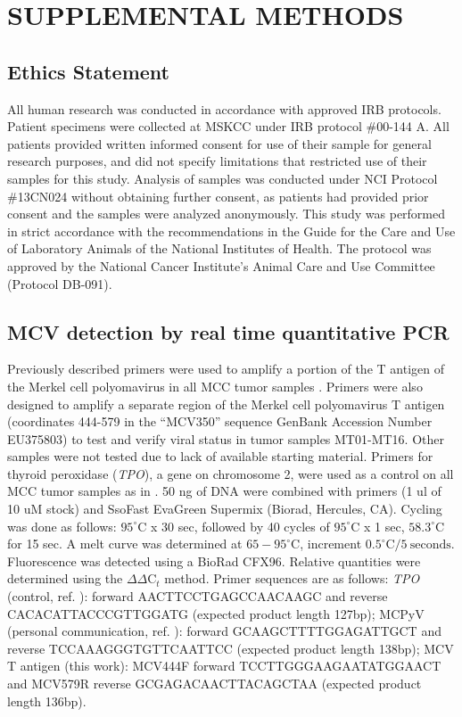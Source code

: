 \documentclass[10pt]{article}
\date{}
\begin{document}

\section*{SUPPLEMENTAL METHODS}

\subsection*{Ethics Statement}

All human research was conducted in accordance with approved IRB protocols.
Patient specimens were collected at MSKCC under IRB protocol \#00-144 A.
All patients provided written informed consent for use of their sample for general research purposes, and did not specify limitations that restricted use of their samples for this study.
Analysis of samples was conducted under NCI Protocol \#13CN024 without obtaining further consent, as patients had provided prior consent and the samples were analyzed anonymously.
This study was performed in strict accordance with the recommendations in the Guide for the Care and Use of Laboratory Animals of the National Institutes of Health.
The protocol was approved by the National Cancer Institute's Animal Care and Use Committee (Protocol DB-091).

\subsection*{MCV detection by real time quantitative PCR}
Previously described primers were used to amplify a portion of the T antigen of the Merkel cell polyomavirus in all MCC tumor samples \cite[personal~communication]{Garneski2008Merkel}.
Primers were also designed to amplify a separate region of the Merkel cell polyomavirus T antigen (coordinates 444-579 in the ``MCV350'' sequence GenBank Accession Number EU375803) to test and verify viral status in tumor samples MT01-MT16.
Other samples were not tested due to lack of available starting material.
Primers for thyroid peroxidase (\emph{TPO}), a gene on chromosome 2, were used as a control on all MCC tumor samples as in \citep{Paulson2008ArrayCGH}.
50 ng of DNA were combined with primers (1 ul of 10 uM stock) and SsoFast EvaGreen Supermix (Biorad, Hercules, CA).
Cycling was done as follows: $95^{\circ}\mathrm{C}$ x 30 sec, followed by 40 cycles of $95^{\circ}\mathrm{C}$ x 1 sec, $58.3^{\circ}\mathrm{C}$ for 15 sec.
A melt curve was determined at $65-95^{\circ}\mathrm{C}$, increment $0.5^{\circ}\mathrm{C}/5\mathrm{~seconds}$.
Fluorescence was detected using a BioRad CFX96.
Relative quantities were determined using the $\Delta\Delta\mathrm{C}_t$ method.
Primer sequences are as follows: \emph{TPO} (control, ref. \citep{Paulson2008ArrayCGH}): forward AACTTCCTGAGCCAACAAGC and reverse CACACATTACCCGTTGGATG (expected product length 127bp);
MCPyV (personal communication, ref. \citep{Garneski2008Merkel}): forward GCAAGCTTTTGGAGATTGCT and reverse TCCAAAGGGTGTTCAATTCC (expected product length 138bp);
MCV T antigen (this work): MCV444F forward TCCTTGGGAAGAATATGGAACT and MCV579R reverse GCGAGACAACTTACAGCTAA (expected product length 136bp).
\end{document}
